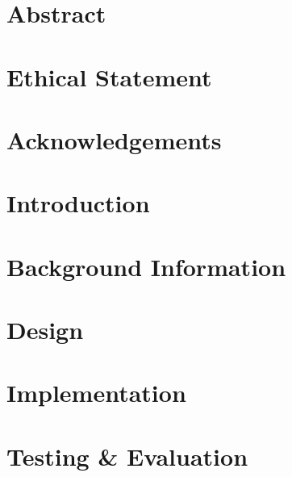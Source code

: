\documentclass[12pt]{article}
\begin{document}
\pagebreak

\section*{Abstract}

\vfill
\section*{Ethical Statement}


\pagebreak

\section*{Acknowledgements}


\pagebreak

\tableofcontents

\pagebreak

\listoffigures
\pagebreak
\listoftables

\pagebreak


\section{Introduction}
\label{introduction}


\section{Background Information}
\label{background}


\section{Design}
\label{design}


\section{Implementation}
\label{implementation}


\section{Testing \& Evaluation}
\label{testing}

\end{document}
